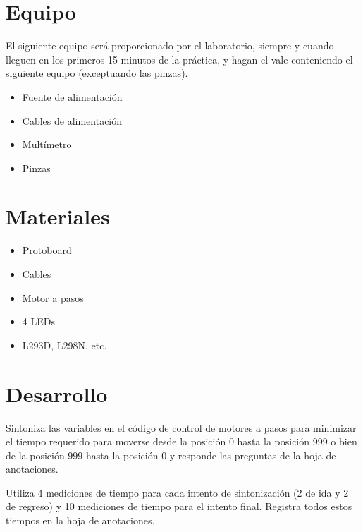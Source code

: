 \section{Equipo}

	El siguiente equipo será proporcionado por el laboratorio, siempre y cuando lleguen en los primeros 15 minutos de la práctica, y hagan el vale conteniendo el siguiente equipo (exceptuando las pinzas).

	\begin{itemize}
		\item Fuente de alimentación
		\item Cables de alimentación
		\item Multímetro
		\item Pinzas
	\end{itemize}
\section{Materiales}

	\begin{itemize}
		\item Protoboard
		\item Cables
		\item Motor a pasos
		\item 4 LEDs
		\item L293D, L298N, etc.
	\end{itemize}

\section{Desarrollo}
	Sintoniza las variables en el código de control de motores a pasos para minimizar el tiempo requerido para moverse desde la posición $0$ hasta la posición $999$ o bien de la posición $999$ hasta la posición $0$ y responde las preguntas de la hoja de anotaciones.

	Utiliza 4 mediciones de tiempo para cada intento de sintonización (2 de ida y 2 de regreso) y 10 mediciones de tiempo para el intento final. Registra todos estos tiempos en la hoja de anotaciones.


